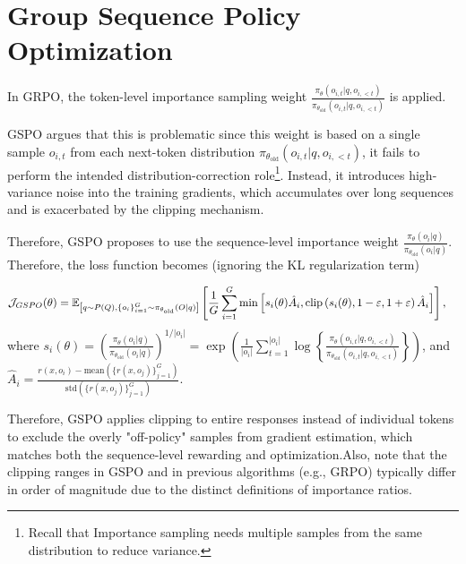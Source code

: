 \section{Group Sequence Policy Optimization}

In GRPO, the token-level importance sampling weight $\frac{\pi_\theta\left(o_{i, t} | q, o_{i,<t}\right)}{\pi_{\theta_{\text{old}}}\left(o_{i, t} | q, o_{i,<t}\right)}$ is applied. 

GSPO argues that this is problematic since this weight  is based on a single sample $o_{i,t}$ from each next-token distribution $\pi_{\theta_{\text{old}}}\left(o_{i, t} | q, o_{i,<t}\right)$, it fails to perform  the intended distribution-correction role\footnote{Recall that Importance sampling needs multiple samples from the same distribution to reduce variance.}. Instead, it introduces high-variance noise into the training gradients, which accumulates over long sequences and is exacerbated by the clipping mechanism.

Therefore, GSPO proposes to use the sequence-level importance weight $\frac{\pi_\theta\left(o_{i} | q\right)}{\pi_{\theta_{\text{old}}}\left(o_{i} | q\right)}$. Therefore, the loss function becomes (ignoring the KL regularization term)

\begin{align}
& {\cal J}_{GSPO}(\theta) \nonumber =\mathbb{E}_{\left[q \sim P(Q),\left\{o_i\right\}_{i=1}^G \sim \pi_{\theta_{\text{old}}}(O | q)\right]} \left[\frac{1}{G} \sum_{i=1}^G \min\left[s_i(\theta)\hat A_i, \operatorname{clip}\left(s_i(\theta), 1-\varepsilon, 1+\varepsilon\right) \hat{A}_{i}\right]\right],
\end{align}
where
$s_i(\theta)=(\frac{\pi_\theta\left(o_{i} | q\right)}{\pi_{\theta_{\text{old}}}\left(o_{i} | q\right)})^{1/|o_i|} = \exp\left(\frac{1}{\left|o_i\right|} \sum_{t=1}^{\left|o_i\right|}\log\left\{\frac{\pi_\theta\left(o_{i, t} | q, o_{i,<t}\right)}{\pi_{\theta_{\text{old}}}\left(o_{i, t} | q, o_{i,<t}\right)}\right\}\right)$, and $\hat A_i = \frac{r(x, o_i) - \text{mean}\left(\{r(x,o_j)\}_{j=1}^G\right)}{\text{std}\left(\{r(x,o_j)\}_{j=1}^G\right)}$.

Therefore, GSPO applies clipping to entire responses instead of individual tokens to exclude the overly "off-policy" samples from gradient estimation, which matches both the sequence-level rewarding and optimization.Also, note that the clipping ranges in GSPO and in previous algorithms (e.g., GRPO) typically differ in order of magnitude due to the distinct definitions of importance ratios.


